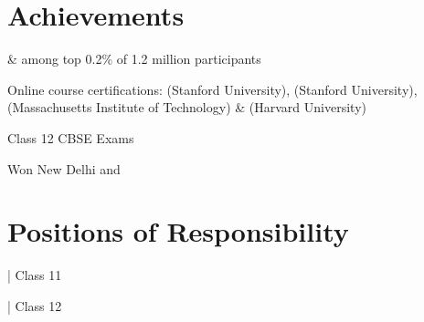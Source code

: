 \documentclass[]{deedy-resume-openfont}
\begin{document}
%
%

\section{Achievements}

\vspace{\topsep} %
\begin{large}
\begin{tightemize}
    \item {}\& among top 0.2\% of 1.2 million participants
    \item Online course certifications: (Stanford University), (Stanford University), (Massachusetts Institute of Technology) \& (Harvard University)
    \item {}Class 12 CBSE Exams
    \item Won New Delhi and 
\end{tightemize}
\end{large}


%
%

\section{Positions of Responsibility}
\vspace{\topsep} %
\begin{large}
\begin{tightemize}
    \item {}| Class 11
    \item {}| Class 12
\end{tightemize}
\end{large}
\sectionsep
\end{document}
